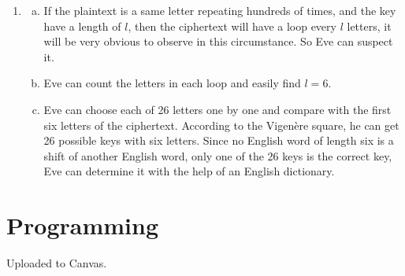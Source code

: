 \documentclass{article}
\begin{document}
\begin{enumerate}
\item
\begin{enumerate}[a)]
\item
If the plaintext is a same letter repeating hundreds of times, and the key have a length of $l$, then the ciphertext will have a loop every $l$ letters, it will be very obvious to observe in this circumstance. So Eve can suspect it.
\item
Eve can count the letters in each loop and easily find $l=6$.
\item
Eve can choose each of 26 letters one by one and compare with the first six letters of the ciphertext. According to the Vigenère square, he can get 26 possible keys with six letters. Since no English word of length six is a shift of another English word, only one of the 26 keys is the correct key, Eve can determine it with the help of an English dictionary.
\end{enumerate}
\end{enumerate}


\section{Programming}
Uploaded to Canvas.
\end{document}
